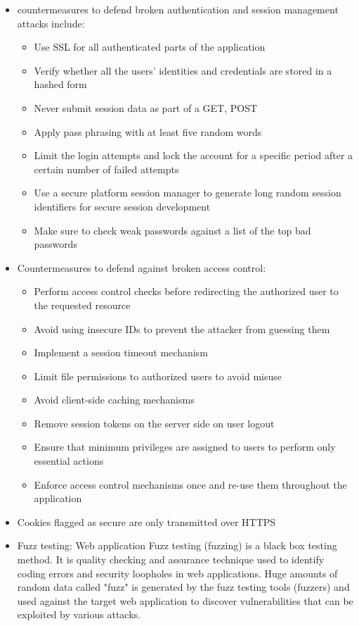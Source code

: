 \begin{itemize}
\begin{itemize}
    \end{itemize}
    \item countermeasures to defend broken authentication and session management attacks include:
    \begin{itemize}
        \item Use SSL for all authenticated parts of the application
        \item Verify whether all the users' identities and credentials are stored in a hashed form
        \item Never submit session data as part of a GET, POST
        \item Apply pass phrasing with at least five random words
        \item Limit the login attempts and lock the account for a specific period after a certain number of failed attempts
        \item Use a secure platform session manager to generate long random session identifiers for secure session development
        \item Make sure to check weak passwords against a list of the top bad passwords
    \end{itemize}
    \item Countermeasures to defend against broken access control:
    \begin{itemize}
        \item Perform access control checks before redirecting the authorized user to the requested resource
        \item Avoid using insecure IDs to prevent the attacker from guessing them
        \item Implement a session timeout mechanism
        \item Limit file permissions to authorized users to avoid misuse
        \item Avoid client-side caching mechanisms
        \item Remove session tokens on the server side on user logout
        \item Ensure that minimum privileges are assigned to users to perform only essential actions
        \item Enforce access control mechanisms once and re-use them throughout the application
    \end{itemize}
    \item Cookies flagged as secure are only transmitted over HTTPS
    \item Fuzz testing: Web application Fuzz testing (fuzzing) is a black box testing method. It is quality checking and assurance technique used to identify coding errors and security loopholes in web applications. Huge amounts of random data called "fuzz" is generated by the fuzz testing tools (fuzzers) and used against the target web application to discover vulnerabilities that can be exploited by various attacks.

\end{itemize}

